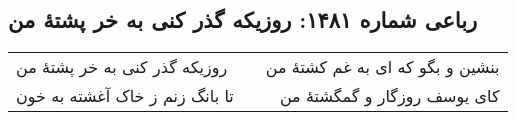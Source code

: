 \begin{center}
\section*{رباعی شماره ۱۴۸۱: روزیکه گذر کنی به خر پشتهٔ من}
\label{sec:1481}
\begin{longtable}{l p{0.5cm} r}
روزیکه گذر کنی به خر پشتهٔ من
&&
بنشین و بگو که ای به غم کشتهٔ من
\\
تا بانگ زنم ز خاک آغشته به خون
&&
کای یوسف روزگار و گمگشتهٔ من
\\
\end{longtable}
\end{center}
